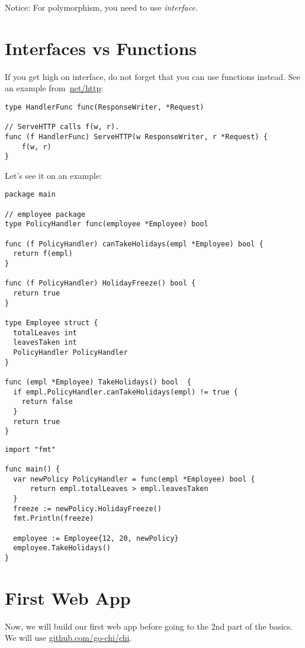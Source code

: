 \documentclass[11pt, letterpaper]{article}
\begin{document}
Notice: For polymorphism, you need to use \emph{interface}.

\section{Interfaces vs Functions}

If you get high on interface, do not forget that you can use functions instead. See an example from~\href{https://golang.org/src/net/http/server.go}{net/http}:

\begin{verbatim}
type HandlerFunc func(ResponseWriter, *Request)

// ServeHTTP calls f(w, r).
func (f HandlerFunc) ServeHTTP(w ResponseWriter, r *Request) {
    f(w, r)
}
\end{verbatim}

Let's see it on an example:

\begin{verbatim}
package main

// employee package
type PolicyHandler func(employee *Employee) bool

func (f PolicyHandler) canTakeHolidays(empl *Employee) bool {
  return f(empl)
}

func (f PolicyHandler) HolidayFreeze() bool {
  return true
}

type Employee struct {
  totalLeaves int
  leavesTaken int
  PolicyHandler PolicyHandler
}

func (empl *Employee) TakeHolidays() bool  {
  if empl.PolicyHandler.canTakeHolidays(empl) != true {
    return false
  }
  return true
}
\end{verbatim}

\begin{verbatim}
import "fmt"

func main() {
  var newPolicy PolicyHandler = func(empl *Employee) bool {
      return empl.totalLeaves > empl.leavesTaken
  }
  freeze := newPolicy.HolidayFreeze()
  fmt.Println(freeze)

  employee := Employee{12, 20, newPolicy}
  employee.TakeHolidays()
}
\end{verbatim}

\section{First Web App}

Now, we will build our first web app before going to the 2nd part of the basics. We will use \href{https://github.com/go-chi/chi}{github.com/go-chi/chi}.
\end{document}
